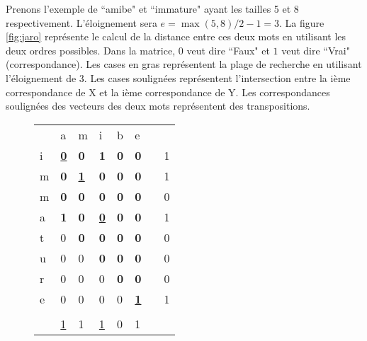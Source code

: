 \documentclass{KodeBook}
\begin{document}
Prenons l'exemple de ``amibe"  et ``immature" ayant les tailles 5 et 8 respectivement.
L'éloignement sera $e=\max(5, 8)/2 - 1 = 3$.
La figure \ref{fig:jaro} représente le calcul de la distance entre ces deux mots en utilisant les deux ordres possibles.
Dans la matrice, $0$ veut dire ``Faux" et $1$  veut dire ``Vrai" (correspondance). 
Les cases en gras représentent la plage de recherche en utilisant l'éloignement de 3. 
Les cases soulignées représentent l'intersection entre la ième correspondance de X et la ième correspondance de Y.
Les correspondances soulignées des vecteurs des deux mots représentent des transpositions. 

\begin{figure}[ht]
	
\begin{minipage}{0.45\textwidth}
\small
\begin{tabular}{|l|l|l|l|l|l|l|l|}
	\cline{1-6}
	  & a & m & i & b & e & \multicolumn{2}{l}{ }\\
	\cline{1-6}\cline{8-8}
	i & \underline{\textbf{0}} & \textbf{0} & \textbf{1} & \textbf{0} & \textbf{0} & & 1\\
	\cline{1-6}\cline{8-8}
	m & \textbf{0} & \underline{\textbf{1}} & \textbf{0} & \textbf{0} & \textbf{0} & & 1\\
	\cline{1-6}\cline{8-8}
	m & \textbf{0} & \textbf{0} & \textbf{0} & \textbf{0} & \textbf{0} & & 0\\
	\cline{1-6}\cline{8-8}
	a & \textbf{1} & \textbf{0} & \underline{\textbf{0}} & \textbf{0} & \textbf{0} & & 1\\
	\cline{1-6}\cline{8-8}
	t & 0 & \textbf{0} & \textbf{0} & \textbf{0} & \textbf{0} & & 0\\
	\cline{1-6}\cline{8-8}
	u & 0 & 0 & \textbf{0} & \textbf{0} & \textbf{0} & & 0\\
	\cline{1-6}\cline{8-8}
	r & 0 & 0 & 0 & \textbf{0} & \textbf{0} & & 0\\
	\cline{1-6}\cline{8-8}
	e & 0 & 0 & 0 & 0 & \underline{\textbf{1}} & & 1\\
	\cline{1-6}\cline{8-8}
	\multicolumn{8}{l}{ }\\
	\cline{2-6}
	 \multicolumn{1}{l|}{} & \underline{1} & 1 & \underline{1} & 0 & 1 & \multicolumn{2}{l}{ }\\
	\cline{2-6}
\end{tabular}

\end{minipage}
\begin{minipage}{0.45\textwidth}


\end{minipage}
\end{figure}
\end{document}
